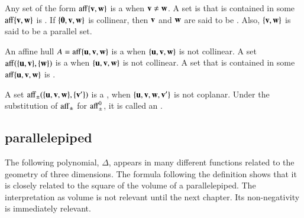 	
\begin{definition}
  Any set of the form ${\operatorname{aff}}\{{\mathbf v},{\mathbf w}\}$ is a  when
  ${\mathbf v}\ne {\mathbf w}$.  A set is that is contained in some $\operatorname{aff}\{{\mathbf v},{\mathbf w}\}$ is
  .  If $\{{\mathbf 0},{\mathbf v},{\mathbf w}\}$ is collinear, then
  ${\mathbf v}$ and ${\mathbf w}$ are said to be . Also, $\{{\mathbf v},{\mathbf w}\}$
  is said to be a parallel set.
\end{definition}
%
%

\begin{definition}\label{def:plane}
  An affine hull $A={\operatorname{aff}}\{{\mathbf u},{\mathbf v},{\mathbf w}\}$ is a  when
  $\{{\mathbf u},{\mathbf v},{\mathbf w}\}$ is not collinear.  A set ${\operatorname{aff}}(\{{\mathbf u},{\mathbf v}\},\{{\mathbf w}\})$
  is a  when $\{{\mathbf u},{\mathbf v},{\mathbf w}\}$ is not collinear. A
  set that is contained in some $\operatorname{aff}\{{\mathbf u},{\mathbf v},{\mathbf w}\}$ is .
\end{definition}
%
%
%
%


\begin{definition} 
A set
  ${\operatorname{aff}}_{\pm}(\{{\mathbf u},{\mathbf v},{\mathbf w}\},\{{\mathbf v}'\})$ is a ,
  when $\{{\mathbf u},{\mathbf v},{\mathbf w},{\mathbf v}'\}$ is not coplanar.  Under the substitution of
  ${\operatorname{aff}}_{\pm}$ for ${\operatorname{aff}}_{\pm}^0$, it is called an
  .
\end{definition}
%
%

\subsection{parallelepiped}\label{sec:piped}
%



The following polynomial, $\Delta$, appears in many different
functions related to the geometry of three dimensions.  The formula
following the definition shows that it is closely related to the
square of the volume of a parallelepiped.  The interpretation as
volume is not relevant until the next chapter.  Its non-negativity is
immediately relevant.  %

